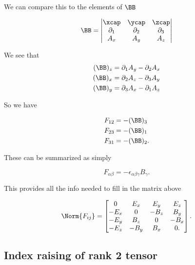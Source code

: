 We can compare this to the elements of $\BB$

\begin{equation}\label{eqn:relativisticElectrodynamicsL11:110}
\BB = 
\begin{vmatrix}
\xcap & \ycap & \zcap \\
\partial_1 & \partial_2 & \partial_3 \\
A_x & A_y & A_z
\end{vmatrix}
\end{equation}

We see that 
\begin{align}\label{eqn:relativisticElectrodynamicsL11:130}
(\BB)_z &= \partial_1 A_y - \partial_2 A_x \\
(\BB)_x &= \partial_2 A_z - \partial_3 A_y \\
(\BB)_y &= \partial_3 A_x - \partial_1 A_z
\end{align}

So we have 

\begin{align}\label{eqn:relativisticElectrodynamicsL11:150}
F_{1 2} &= - (\BB)_3 \\
F_{2 3} &= - (\BB)_1 \\
F_{3 1} &= - (\BB)_2.
\end{align}

These can be summarized as simply

\begin{equation}\label{eqn:relativisticElectrodynamicsL11:170}
F_{\alpha\beta} = - \epsilon_{\alpha\beta\gamma} B_\gamma.
\end{equation}

This provides all the info needed to fill in the matrix above 

\begin{equation}\label{eqn:relativisticElectrodynamicsL11:190}
\Norm{ F_{i j} } = 
\begin{bmatrix}
0 & E_x & E_y & E_z \\
-E_x & 0 & -B_z & B_y \\
-E_y & B_z & 0 & -B_x \\
-E_z & -B_y & B_x & 0.
\end{bmatrix}.
\end{equation}

\subsection{Index raising of rank 2 tensor}

